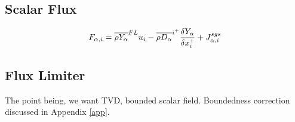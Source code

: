 \documentclass[11pt]{article}
\begin{document}
\subsection{Scalar Flux}

\begin{equation}
\label{eqn_flux}
F_{\alpha,i} = \overline{\rho Y_\alpha}^{\tiny FL} u_i - \overline{\rho D_\alpha}^{i^+} \frac{\delta Y_\alpha}{\delta x_i^{\scriptscriptstyle +}} + J_{\alpha,i}^{sgs}
\end{equation}

\subsection{Flux Limiter}

The point being, we want TVD, bounded scalar field.  Boundedness correction discussed in Appendix \ref{app}.
\end{document}
